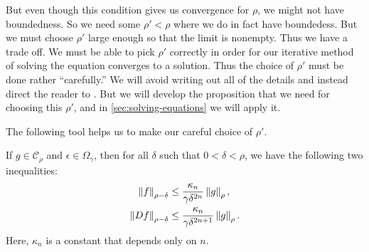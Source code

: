 \documentclass[twoside,letterpaper,11pt]{article}
\numberwithin{equation}{section}
\begin{document}
But even though this condition gives us convergence for $\rho$, we might not
have boundedness.
So we need some $\rho' < \rho$ where we do in fact have boundedess.
But we must choose $\rho'$ large enough so that the limit is nonempty.
Thus we have a trade off.
We must be able to pick $\rho'$ correctly in order for our iterative method of
solving the equation converges to a solution.
Thus the choice of $\rho'$ must be done rather ``carefully.''
We will avoid writing out all of the details and instead direct the reader to
\cite{hi02}.
But we will develop the proposition that we need for choosing this $\rho'$, and
in \cref{sec:solving-equations} we will apply it.

The following tool helps us to make our careful choice of $\rho'$.
\begin{prop}
  \label{prop:tool}
  If $g \in \mathcal{C}_{\rho}$ and $\epsilon \in \Omega_{\gamma}$, then for all
  $\delta$ such that $0 < \delta < \rho$, we have the following two
  inequalities:
  \begin{align*}
    \norm{f}_{\rho - \delta} &\leq \frac{\kappa_n}{\gamma
                               \delta^{2n}}\norm{g}_{\rho},\\
    \norm{\Dif f}_{\rho - \delta} &\leq \frac{\kappa_n}{\gamma \delta^{2n + 1}}
                    \norm{g}_{\rho}.
  \end{align*}
  Here, $\kappa_n$ is a constant that depends only on $n$.
\end{prop}
\end{document}
